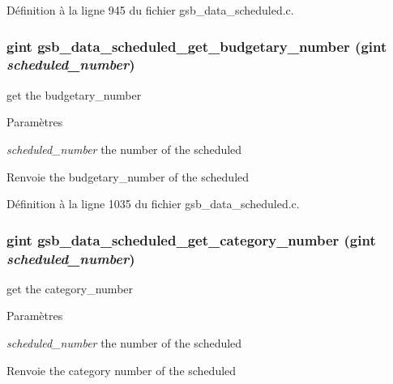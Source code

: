 Définition à la ligne 945 du fichier gsb\_\-data\_\-scheduled.c.

\subsubsection[{gsb\_\-data\_\-scheduled\_\-get\_\-budgetary\_\-number}]{\setlength{\rightskip}{0pt plus 5cm}gint gsb\_\-data\_\-scheduled\_\-get\_\-budgetary\_\-number (gint {\em scheduled\_\-number})}\label{gsb__data__scheduled_8c_a3019884175ba5217da66a26601fbf9f2}
get the budgetary\_\-number


\begin{DoxyParams}{Paramètres}
\item[{\em scheduled\_\-number}]the number of the scheduled\end{DoxyParams}
\begin{DoxyReturn}{Renvoie}
the budgetary\_\-number of the scheduled 
\end{DoxyReturn}


Définition à la ligne 1035 du fichier gsb\_\-data\_\-scheduled.c.

\subsubsection[{gsb\_\-data\_\-scheduled\_\-get\_\-category\_\-number}]{\setlength{\rightskip}{0pt plus 5cm}gint gsb\_\-data\_\-scheduled\_\-get\_\-category\_\-number (gint {\em scheduled\_\-number})}\label{gsb__data__scheduled_8c_a6d9e3ecf8c981f4d49d7b4c3d0f5dd86}
get the category\_\-number


\begin{DoxyParams}{Paramètres}
\item[{\em scheduled\_\-number}]the number of the scheduled\end{DoxyParams}
\begin{DoxyReturn}{Renvoie}
the category number of the scheduled 
\end{DoxyReturn}


